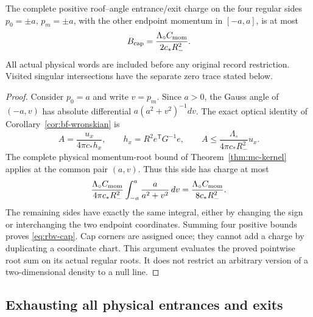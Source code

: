 \begin{lemma}
\label{lem:rbv-cap}
The complete positive roof--angle entrance/exit charge on the four
regular sides $p_0=\pm a$, $p_m=\pm a$, with the other endpoint
momentum in $[-a,a]$, is at most
\begin{equation}\label{eq:rbv-cap}
                B_{\rm cap}
                    =\frac{\Lambda_\circ C_{\rm mom}}
                                  {2c_*R_-^2}.
\end{equation}
All actual physical words are included before any original record
restriction.  Visited singular intersections have the separate
zero trace stated below.
\end{lemma}
\begin{proof}
Consider $p_0=a$ and write $v=p_m$.  Since $a>0$, the Gauss
angle of $(-a,v)$ has absolute differential
$a(a^2+v^2)^{-1}dv$.  The exact optical identity of
Corollary~\ref{cor:bf-wronskian} is
\[
 A=\frac{u_x}{4\pi c_*h_x},\qquad
 h_x=R^2e^{\mathsf T}G^{-1}e,\qquad
 A\le\frac{\Lambda_\circ}{4\pi c_*R_-^2}u_x.
\]
The complete physical momentum-root bound of
Theorem~\ref{thm:mc-kernel} applies at the common pair $(a,v)$.
Thus this side has charge at most
\[
 \frac{\Lambda_\circ C_{\rm mom}}{4\pi c_*R_-^2}
                  \int_{-a}^a\frac{a}{a^2+v^2}\,dv
          =\frac{\Lambda_\circ C_{\rm mom}}{8c_*R_-^2}.
\]
The remaining sides have exactly the same integral, either by
changing the sign or interchanging the two endpoint coordinates.
Summing four positive bounds proves \eqref{eq:rbv-cap}.
Cap corners are assigned once; they cannot add a charge by
duplicating a coordinate chart.  This argument evaluates the
proved pointwise root sum on its actual regular roots.  It does
not restrict an arbitrary version of a two-dimensional density
to a null line.
\end{proof}

\subsection{Exhausting all physical entrances and exits}

